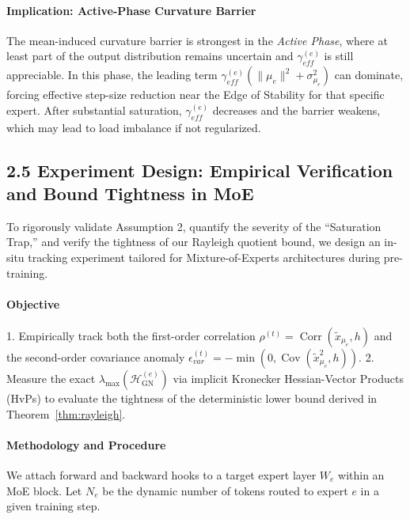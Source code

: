 \documentclass[11pt]{article}
\begin{document}
\paragraph{Implication: Active-Phase Curvature Barrier}
The mean-induced curvature barrier is strongest in the \emph{Active Phase}, where at least part of the output distribution remains uncertain and $\gamma_{eff}^{(e)}$ is still appreciable. In this phase, the leading term $\gamma_{eff}^{(e)}(\|\mu_e\|^2 + \sigma_{\mu_e}^2)$ can dominate, forcing effective step-size reduction near the Edge of Stability for that specific expert. After substantial saturation, $\gamma_{eff}^{(e)}$ decreases and the barrier weakens, which may lead to load imbalance if not regularized.

\subsection*{2.5 Experiment Design: Empirical Verification and Bound Tightness in MoE}

To rigorously validate Assumption 2, quantify the severity of the ``Saturation Trap,'' and verify the tightness of our Rayleigh quotient bound, we design an in-situ tracking experiment tailored for Mixture-of-Experts architectures during pre-training.

\paragraph{Objective}
1. Empirically track both the first-order correlation $\rho^{(t)} = \operatorname{Corr}(\tilde{x}_{\mu_e}, h)$ and the second-order covariance anomaly $\epsilon_{var}^{(t)} = -\min(0, \operatorname{Cov}(\tilde{x}_{\mu_e}^2, h))$.
2. Measure the exact $\lambda_{\max}(\mathcal{H}_{\mathrm{GN}}^{(e)})$ via implicit Kronecker Hessian-Vector Products (HvPs) to evaluate the tightness of the deterministic lower bound derived in Theorem~\ref{thm:rayleigh}.

\paragraph{Methodology and Procedure}
We attach forward and backward hooks to a target expert layer $W_e$ within an MoE block. Let $N_e$ be the dynamic number of tokens routed to expert $e$ in a given training step.
\end{document}
